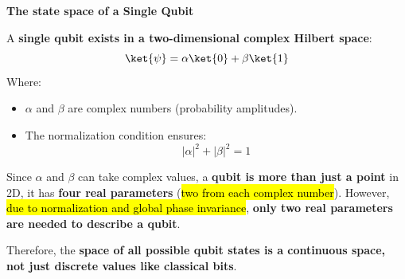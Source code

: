 \highspace
\begin{flushleft}
    \textcolor{Green3}{ \textbf{The state space of a Single Qubit}}
\end{flushleft}
A \textbf{single qubit exists in a two-dimensional complex Hilbert space}:
\begin{equation*}
    \ket{\psi} = \alpha\ket{0} + \beta\ket{1}
\end{equation*}
Where:
\begin{itemize}
    \item $\alpha$ and $\beta$ are complex numbers (probability amplitudes).
    \item The normalization condition ensures:
    \begin{equation*}
        \left|\alpha\right|^{2} + \left|\beta\right|^{2} = 1
    \end{equation*}
\end{itemize}
Since $\alpha$ and $\beta$ can take complex values, a \textbf{qubit is more than just a point} in 2D, it has \textbf{four real parameters} (\hl{two from each complex number}). However, \hl{due to normalization and global phase invariance}, \textbf{only two real parameters are needed to describe a qubit}.

\highspace
Therefore, the \textbf{space of all possible qubit states is a continuous space, not just discrete values like classical bits}.

\newpage

